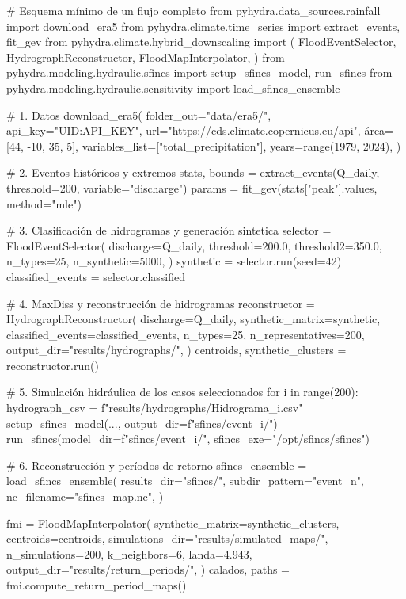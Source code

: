 \begin{codeblock}[fontsize=\scriptsize,baselinestretch=0.92]
# Esquema mínimo de un flujo completo
from pyhydra.data_sources.rainfall import download_era5
from pyhydra.climate.time_series import extract_events, fit_gev
from pyhydra.climate.hybrid_downscaling import (
    FloodEventSelector, HydrographReconstructor,
    FloodMapInterpolator,
)
from pyhydra.modeling.hydraulic.sfincs import setup_sfincs_model, run_sfincs
from pyhydra.modeling.hydraulic.sensitivity import load_sfincs_ensemble

# 1. Datos
download_era5(
    folder_out="data/era5/",
    api_key="UID:API_KEY",
    url="https://cds.climate.copernicus.eu/api",
    área=[44, -10, 35, 5],
    variables_list=["total_precipitation"],
    years=range(1979, 2024),
)

# 2. Eventos históricos y extremos
stats, bounds = extract_events(Q_daily, threshold=200, variable="discharge")
params = fit_gev(stats["peak"].values, method="mle")

# 3. Clasificación de hidrogramas y generación sintetica
selector = FloodEventSelector(
    discharge=Q_daily,
    threshold=200.0,
    threshold2=350.0,
    n_types=25,
    n_synthetic=5000,
)
synthetic = selector.run(seed=42)
classified_events = selector.classified

# 4. MaxDiss y reconstrucción de hidrogramas
reconstructor = HydrographReconstructor(
    discharge=Q_daily,
    synthetic_matrix=synthetic,
    classified_events=classified_events,
    n_types=25,
    n_representatives=200,
    output_dir="results/hydrographs/",
)
centroids, synthetic_clusters = reconstructor.run()

# 5. Simulación hidráulica de los casos seleccionados
for i in range(200):
    hydrograph_csv = f"results/hydrographs/Hidrograma_{i}.csv"
    setup_sfincs_model(..., output_dir=f"sfincs/event_{i}/")
    run_sfincs(model_dir=f"sfincs/event_{i}/",
               sfincs_exe="/opt/sfincs/sfincs")

# 6. Reconstrucción y períodos de retorno
sfincs_ensemble = load_sfincs_ensemble(
    results_dir="sfincs/",
    subdir_pattern="event_{n}",
    nc_filename="sfincs_map.nc",
)

fmi = FloodMapInterpolator(
    synthetic_matrix=synthetic_clusters,
    centroids=centroids,
    simulations_dir="results/simulated_maps/",
    n_simulations=200,
    k_neighbors=6,
    landa=4.943,
    output_dir="results/return_periods/",
)
calados, paths = fmi.compute_return_period_maps()
\end{codeblock}

